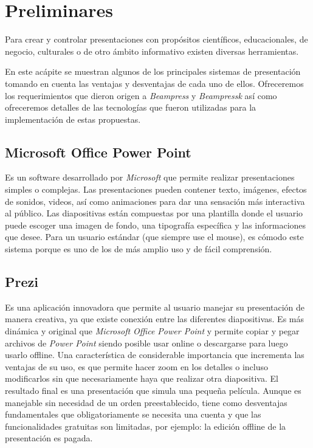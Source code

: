\chapter{Preliminares} %
\label{cha:preliminares}


	Para crear y controlar presentaciones con propósitos científicos, educacionales, de negocio, culturales o de otro ámbito informativo existen diversas herramientas.

	En este acápite se muestran algunos de los principales sistemas de presentación tomando en cuenta las ventajas y desventajas de cada uno de ellos. Ofreceremos los requerimientos que dieron origen a \textit{Beampress} y \textit{Beampressk} así como ofreceremos detalles de las tecnologías que fueron utilizadas para la implementación de estas propuestas.	

	\section*{Microsoft Office Power Point} %
	\label{sec:microsoft_office_power_point}

		Es un software desarrollado por \textit{Microsoft}  que permite realizar presentaciones simples o complejas. Las presentaciones pueden contener texto, imágenes, efectos de sonidos, videos, así como animaciones para dar una sensación más interactiva al público. Las diapositivas están compuestas por una plantilla donde el usuario puede escoger una imagen de fondo, una tipografía específica y las informaciones que desee. Para un usuario estándar (que siempre use el mouse), es cómodo este sistema porque es uno de los de más amplio uso y de fácil comprensión. 


	\section*{Prezi} %
	\label{sec:prezi}

		Es una aplicación innovadora que permite al usuario manejar su presentación de manera creativa, ya que existe conexión entre las diferentes diapositivas. Es más dinámica y original que \textit{Microsoft Office Power Point} y permite copiar y pegar archivos de \textit{Power Point} siendo posible usar online o descargarse para luego usarlo offline. Una característica de considerable importancia que incrementa las ventajas de su uso, es que permite hacer zoom en los detalles o incluso modificarlos sin que necesariamente haya que realizar otra diapositiva. El resultado final es una presentación que simula una pequeña película. Aunque es manejable sin necesidad de un orden preestablecido, tiene como desventajas fundamentales que obligatoriamente se necesita una cuenta y que las funcionalidades gratuitas son limitadas, por ejemplo: la edición offline de la presentación es pagada.


